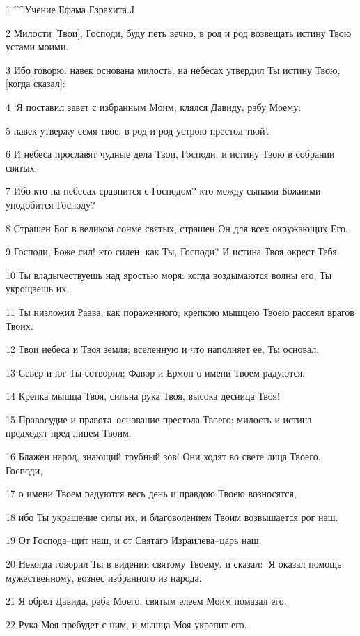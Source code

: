\par 1 ^^Учение Ефама Езрахита.^^
\par 2 Милости [Твои], Господи, буду петь вечно, в род и род возвещать истину Твою устами моими.
\par 3 Ибо говорю: навек основана милость, на небесах утвердил Ты истину Твою, [когда сказал]:
\par 4 `Я поставил завет с избранным Моим, клялся Давиду, рабу Моему:
\par 5 навек утвержу семя твое, в род и род устрою престол твой'.
\par 6 И небеса прославят чудные дела Твои, Господи, и истину Твою в собрании святых.
\par 7 Ибо кто на небесах сравнится с Господом? кто между сынами Божиими уподобится Господу?
\par 8 Страшен Бог в великом сонме святых, страшен Он для всех окружающих Его.
\par 9 Господи, Боже сил! кто силен, как Ты, Господи? И истина Твоя окрест Тебя.
\par 10 Ты владычествуешь над яростью моря: когда воздымаются волны его, Ты укрощаешь их.
\par 11 Ты низложил Раава, как пораженного; крепкою мышцею Твоею рассеял врагов Твоих.
\par 12 Твои небеса и Твоя земля; вселенную и что наполняет ее, Ты основал.
\par 13 Север и юг Ты сотворил; Фавор и Ермон о имени Твоем радуются.
\par 14 Крепка мышца Твоя, сильна рука Твоя, высока десница Твоя!
\par 15 Правосудие и правота--основание престола Твоего; милость и истина предходят пред лицем Твоим.
\par 16 Блажен народ, знающий трубный зов! Они ходят во свете лица Твоего, Господи,
\par 17 о имени Твоем радуются весь день и правдою Твоею возносятся,
\par 18 ибо Ты украшение силы их, и благоволением Твоим возвышается рог наш.
\par 19 От Господа--щит наш, и от Святаго Израилева--царь наш.
\par 20 Некогда говорил Ты в видении святому Твоему, и сказал: `Я оказал помощь мужественному, вознес избранного из народа.
\par 21 Я обрел Давида, раба Моего, святым елеем Моим помазал его.
\par 22 Рука Моя пребудет с ним, и мышца Моя укрепит его.

